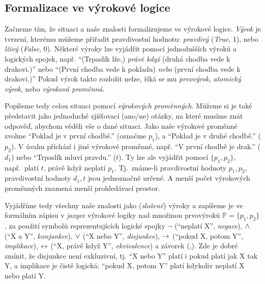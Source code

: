 \subsection{Formalizace ve výrokové logice}

Začneme tím, že situaci a naše znalosti formalizujeme ve výrokové logice. \emph{Výrok} je tvrzení, kterému můžeme přiřadit pravdivostní hodnotu: \emph{pravdivý} (\emph{True}, 1), nebo \emph{lživý} (\emph{False}, 0). Některé výroky lze vyjádřit pomocí jednodušších výroků a logických spojek, např.  ``(Trpaslík lže,) \emph{právě když} (druhá chodba vede k drakovi.)'' nebo ``(První chodba vede k pokladu) \emph{nebo} (první chodba vede k drakovi.)'' Pokud výrok takto rozložit nelze, říká se mu \emph{prvovýrok}, \emph{atomický výrok}, nebo \emph{výroková proměnná}.

Popíšeme tedy celou situaci pomocí \emph{výrokových proměnných}. Můžeme si je také představit jako jednoduché zjišťovací (ano/ne) otázky, na které musíme znát odpověď, abychom věděli vše o dané situaci. Jako naše výrokové proměnné zvolme ``Poklad je v první chodbě.'' (označme \(p_1\)), a ``Poklad je v druhé chodbě.'' (\(p_2\)). V úvahu přichází i jiné výrokové proměnné, např. ``V první chodbě je drak.'' (\(d_1\)) nebo ``Trpaslík mluví pravdu.'' (\(t\)). Ty lze ale vyjádřit pomocí \( \{p_1,p_2\} \), např.\ platí \(t\), právě když neplatí \(p_1\). Tj.\ známe-li pravdivostní hodnoty \(p_1,p_2\), pravdivostní hodnoty \(d_1,t\) jsou jednoznačně určené. A menší počet výrokových proměnných znamená menší prohledávací prostor.

Vyjádříme tedy všechny naše znalosti jako (\emph{složené}) výroky a zapíšeme je ve formálním zápisu v \emph{jazyce} výrokové logiky nad množinou prvovýroků \( \mathbb P=\{p_1,p_2\} \), za použití symbolů reprezentujících logické spojky \( \neg \) (``neplatí X'', \emph{negace}), \( {\land} \) (``X a Y'', \emph{konjunkce}), \( {\lor} \) (``X nebo Y'', \emph{disjunkce}), \( {\mathbin{\rightarrow}} \) (``pokud X, potom Y'', \emph{implikace}), \( {\mathbin{\leftrightarrow}} \) (``X, právě když Y'', \emph{ekvivalence}) a závorek (,). Zde je dobré zmínit, že disjunkce není exkluzivní, tj. ``X nebo Y'' platí i pokud platí jak X tak Y, a  implikace je čistě logická: ``pokud X, potom Y'' platí kdykoliv neplatí X nebo platí Y.

